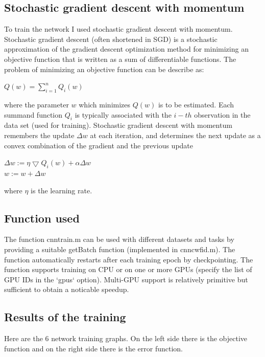 \documentclass[]{report}
\begin{document}
\subsection{Stochastic gradient descent with momentum}

To train the network I used stochastic gradient descent with momentum. Stochastic gradient descent (often shortened in SGD) is a stochastic approximation of the gradient descent optimization method for minimizing an objective function that is written as a sum of differentiable functions. The problem of minimizing an objective function can be describe as:

\begin{center}

	$ Q(w)= \sum\limits_{i=1}^n Q_{i}(w) $

\end{center}

where the parameter $ w $ which minimizes $ Q(w) $ is to be estimated. Each summand function $ Q_{i} $ is typically associated with the $ i-th $ observation in the data set (used for training). 
Stochastic gradient descent with momentum remembers the update $ \Delta w $ at each iteration, and determines the next update as a convex combination of the gradient and the previous update

\begin{center}

	$ \Delta w:= \eta \bigtriangledown  Q_{i}(w) + \alpha \Delta w $\\
	$ w := w+ \Delta w $

\end{center}

where $ \eta $ is the learning rate.

\subsection{Function used}
The function cnn\textunderscore train.m can be used with different datasets and tasks by providing a suitable getBatch function (implemented in  cnn\textunderscore cwfid.m). The function automatically restarts after each training epoch by checkpointing. The function supports training on CPU or on one or more GPUs (specify the list of GPU IDs in the `gpus` option). Multi-GPU support is relatively primitive but sufficient to obtain a noticable speedup.

\subsection{Results of the training}
Here are the 6 network training graphs. On the left side there is the objective function and on the right side there is the error function.
\end{document}
